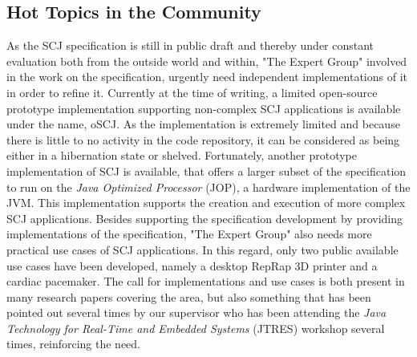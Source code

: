 

\subsection{Hot Topics in the Community} %
\label{sub:interestingresearch}
As the SCJ specification is still in public draft and thereby under constant evaluation both from the outside world and within, "The Expert Group" involved in the work on the specification, urgently need independent implementations of it in order to refine it\cite{Schoeberl:2012:SCJonJava}. Currently at the time of writing, a limited open-source prototype implementation supporting non-complex SCJ applications is available under the name, oSCJ\cite{oSCJ}. As the implementation is extremely limited and because there is little to no activity in the code repository, it can be considered as being either in a hibernation state or shelved. Fortunately, another prototype implementation of SCJ is available, that offers a larger subset of the specification to run on the \textit{Java Optimized Processor} (JOP), a hardware implementation of the JVM\cite{Schoeberl:2012:SCJonJava}. This implementation supports the creation and execution of more complex SCJ applications. Besides supporting the specification development by providing implementations of the specification, "The Expert Group" also needs more practical use cases of SCJ applications. In this regard, only two public available use cases have been developed, namely a desktop RepRap 3D printer\cite{Schoeberl:2012:RepRap} and a cardiac pacemaker\cite{Singh:2012:CPC:2388936.2388948}. The call for implementations and use cases is both present in many research papers covering the area, but also something that has been pointed out several times by our supervisor who has been attending the \textit{Java Technology for Real-Time and Embedded Systems} (JTRES) workshop several times, reinforcing the need.


